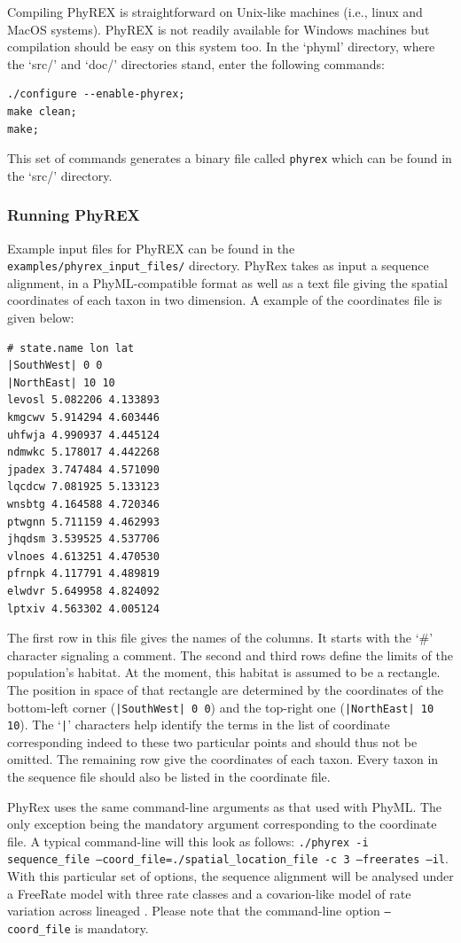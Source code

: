 \documentclass[a4paper,12pt]{article}
\newcommand{\x}[1]{\texttt{#1}}
\begin{document}
Compiling PhyREX is straightforward on Unix-like  machines (i.e., linux and MacOS systems). PhyREX
is not readily available for Windows machines but  compilation should be easy on this system too. In
the `phyml' directory, where the `src/'  and `doc/' directories stand, enter the following commands:
{\setlength{\baselineskip}{0.5\baselineskip}
\begin{verbatim}
./configure --enable-phyrex;
make clean;
make;
\end{verbatim} } This set of commands generates  a binary file called \x{phyrex} which can be found
  in the `src/' directory.

\subsubsection{Running PhyREX}

Example input files for PhyREX can be found in the \x{examples/phyrex\_input\_files/} directory.
PhyRex takes as input a sequence alignment, in a PhyML-compatible format as well as a text file
giving the spatial coordinates of each taxon in two dimension. A example of the coordinates file is given
below:
\begin{Verbatim}[frame=single, label=Valid PhyRex spatial location file, samepage=true, baselinestretch=0.5]
# state.name lon lat
|SouthWest| 0 0
|NorthEast| 10 10 
levosl 5.082206 4.133893 
kmgcwv 5.914294 4.603446 
uhfwja 4.990937 4.445124 
ndmwkc 5.178017 4.442268 
jpadex 3.747484 4.571090 
lqcdcw 7.081925 5.133123 
wnsbtg 4.164588 4.720346 
ptwgnn 5.711159 4.462993 
jhqdsm 3.539525 4.537706 
vlnoes 4.613251 4.470530 
pfrnpk 4.117791 4.489819 
elwdvr 5.649958 4.824092 
lptxiv 4.563302 4.005124 
\end{Verbatim}
The first row in this file gives the names of the columns. It starts with the `\#' character signaling a
comment. The second and third rows define the limits of the population's habitat. At the
moment, this habitat is assumed to be a rectangle. The position in space of that rectangle are
determined by the coordinates of the bottom-left corner (\x{|SouthWest| 0 0}) and the top-right
one (\x{|NorthEast| 10 10}). The `\x{|}' characters help  identify the terms in the list of coordinate
corresponding indeed to these two particular points and should thus not be omitted. The remaining
row give the coordinates of each taxon. Every taxon in the sequence file should also be listed in
the coordinate file.

PhyRex uses the same command-line arguments as that used with PhyML. The only exception being the
mandatory argument corresponding to the coordinate file. A typical command-line will this look as
follows: \x{./phyrex -i sequence\_file --coord\_file=./spatial\_location\_file -c 3 --freerates
  --il}. With this particular set of options, the sequence alignment will be analysed under a
FreeRate  model \cite{soubrier12} with three rate classes and a covarion-like model of rate variation
across lineaged \cite{guindon13}. Please note that the command-line option \x{--coord\_file} is mandatory.
\end{document}
